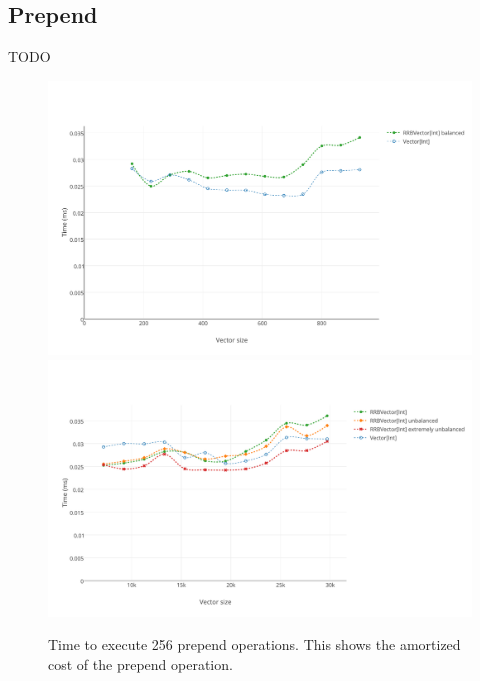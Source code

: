 \subsection{Prepend}
\color{red} TODO \color{black}

\begin{figure}[h!]
  \centering
  \includegraphics[width=\textwidth]{Benchmarks/Prepend_2.pdf}
  \includegraphics[width=\textwidth]{Benchmarks/Prepend_3.pdf}
  \label{PrependBenchmarks}
  \caption{Time to execute 256 prepend operations. This shows the amortized cost of the prepend operation.}
\end{figure}

